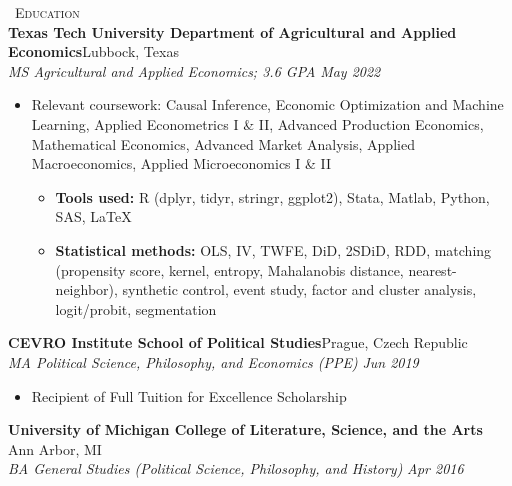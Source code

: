 \documentclass[a4paper,11pt]{article}
\newcommand{\header} [1] {
    \vspace{1mm}
    {\textsc{\large{\xrfill[0.5ex]{0.5pt}~#1~\xrfill[0.5ex]{0.5pt}}}} %
}
\begin{document}

\header{Education} \\
\vspace{1mm}
\textbf{Texas Tech University Department of Agricultural and Applied Economics}\hfill Lubbock, Texas\\
\textit{MS Agricultural and Applied Economics; 3.6 GPA} \hfill  \emph{May 2022} \\
\begin{itemize}
    \item Relevant coursework: Causal Inference, Economic Optimization and Machine Learning, Applied Econometrics I \& II, Advanced Production Economics, Mathematical Economics, Advanced Market Analysis, Applied Macroeconomics, Applied Microeconomics I \& II
    \begin{itemize}
        \item \textbf{Tools used:} R (dplyr, tidyr, stringr, ggplot2), Stata, Matlab, Python, SAS, \LaTeX
        \item \textbf{Statistical methods:} OLS, IV, TWFE, DiD, 2SDiD, RDD, matching (propensity score, kernel, entropy, Mahalanobis distance,  nearest-neighbor), synthetic control, event study, factor and cluster analysis, logit/probit, segmentation
    \end{itemize}
\end{itemize}
\vspace{1mm}

\textbf{CEVRO Institute School of Political Studies}\hfill Prague, Czech Republic\\
\textit{MA Political Science, Philosophy, and Economics (PPE)} \hfill  \emph{Jun 2019}\\
\begin{itemize}
    \item Recipient of Full Tuition for Excellence Scholarship
\end{itemize}
\vspace{1mm}

\textbf{University of Michigan College of Literature, Science, and the Arts} \hfill Ann Arbor, MI\\
\textit{BA General Studies (Political Science, Philosophy, and History)} \hfill  \emph{Apr 2016}\\

\vspace{1mm}
\end{document}
